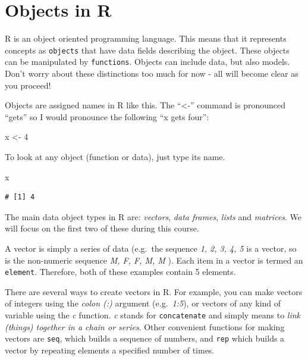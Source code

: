 \documentclass[
  a4paperpaper,
]{book}
\newenvironment{Shaded}{\begin{snugshade}}{\end{snugshade}}
\newcommand{\DecValTok}[1]{\textcolor[rgb]{0.00,0.00,0.81}{#1}}
\newcommand{\NormalTok}[1]{#1}
\newcommand{\StringTok}[1]{\textcolor[rgb]{0.31,0.60,0.02}{#1}}
\begin{document}
\hypertarget{objects-in-r}{%
\section{Objects in R}\label{objects-in-r}}

R is an object oriented programming language. This means that it represents concepts as \texttt{objects} that have data fields describing the object. These objects can be manipulated by \texttt{functions}. Objects can include data, but also models. Don't worry about these distinctions too much for now - all will become clear as you proceed!

Objects are assigned names in R like this. The ``\textless-'' command is pronounced ``gets'' so I would pronounce the following ``x gets four'':

\begin{Shaded}
\begin{Highlighting}[]
\NormalTok{x \textless{}{-}}\StringTok{ }\DecValTok{4}
\end{Highlighting}
\end{Shaded}

To look at any object (function or data), just type its name.

\begin{Shaded}
\begin{Highlighting}[]
\NormalTok{x}
\end{Highlighting}
\end{Shaded}

\begin{verbatim}
# [1] 4
\end{verbatim}

The main data object types in R are: \emph{vectors}, \emph{data frames}, \emph{lists} and \emph{matrices}. We will focus on the first two of these during this course.

A vector is simply a series of data (e.g.~the sequence \emph{1, 2, 3, 4, 5} is a vector, so is the non-numeric sequence \emph{M, F, F, M, M} ). Each item in a vector is termed an \texttt{element}. Therefore, both of these examples contain 5 elements.

There are several ways to create vectors in R. For example, you can make vectors of integers using the \emph{colon (:)} argument (e.g.~\emph{1:5}), or vectors of any kind of variable using the \emph{c} function. \emph{c} stands for \texttt{concatenate} and simply means to \emph{link (things) together in a chain or series}. Other convenient functions for making vectors are \texttt{seq}, which builds a sequence of numbers, and \texttt{rep} which builds a vector by repeating elements a specified number of times.
\end{document}
